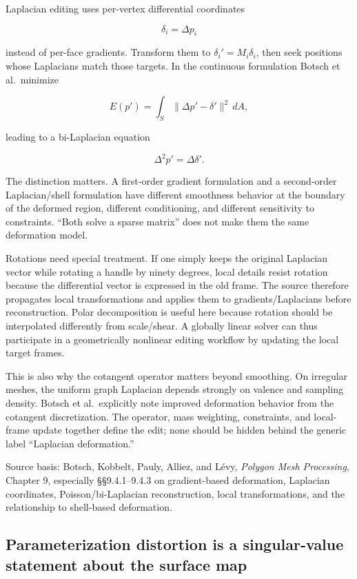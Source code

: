 Laplacian editing uses per-vertex differential coordinates

\[
\delta_i=\Delta p_i
\]

instead of per-face gradients. Transform them to \(\delta_i'=M_i\delta_i\), then seek positions whose Laplacians match those targets. In the continuous formulation Botsch et al.~minimize

\[
E(p')
=
\int_S
\|\Delta p'-\delta'\|^2\,dA,
\]

leading to a bi-Laplacian equation

\[
\Delta^2p'
=
\Delta\delta'.
\]

The distinction matters. A first-order gradient formulation and a second-order Laplacian/shell formulation have different smoothness behavior at the boundary of the deformed region, different conditioning, and different sensitivity to constraints. ``Both solve a sparse matrix'' does not make them the same deformation model.

Rotations need special treatment. If one simply keeps the original Laplacian vector while rotating a handle by ninety degrees, local details resist rotation because the differential vector is expressed in the old frame. The source therefore propagates local transformations and applies them to gradients/Laplacians before reconstruction. Polar decomposition is useful here because rotation should be interpolated differently from scale/shear. A globally linear solver can thus participate in a geometrically nonlinear editing workflow by updating the local target frames.

This is also why the cotangent operator matters beyond smoothing. On irregular meshes, the uniform graph Laplacian depends strongly on valence and sampling density. Botsch et al.~explicitly note improved deformation behavior from the cotangent discretization. The operator, mass weighting, constraints, and local-frame update together define the edit; none should be hidden behind the generic label ``Laplacian deformation.''

Source basis: Botsch, Kobbelt, Pauly, Alliez, and Lévy, \emph{Polygon Mesh Processing}, Chapter 9, especially §§9.4.1--9.4.3 on gradient-based deformation, Laplacian coordinates, Poisson/bi-Laplacian reconstruction, local transformations, and the relationship to shell-based deformation.

\subsection{Parameterization distortion is a singular-value statement about the surface map}\label{03-visual-computing-i-ch002-parameterization-distortion-is-a-singular-value-statement-about-the-surface-map}

